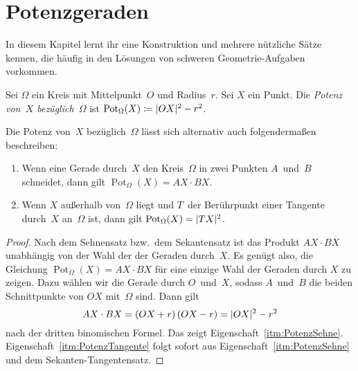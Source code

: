 \section{Potenzgeraden}\label{kapitel:Potenzgeraden}
In diesem Kapitel lernt ihr eine Konstruktion und mehrere nützliche Sätze kennen, die häufig in den Lösungen von schweren Geometrie-Aufgaben vorkommen.
\begin{definition}
	Sei $\Omega$ ein Kreis mit Mittelpunkt~$O$ und Radius~$r$. Sei $X$ ein Punkt. Die \emph{Potenz von~$X$
		bezüglich~$\Omega$} ist $\operatorname{Pot}_\Omega(X)\coloneqq \lvert OX\rvert^2-r^2$.
\end{definition}

\begin{satzmitnamen}
	Die Potenz von~$X$ bezüglich~$\Omega$ lässt sich alternativ auch folgendermaßen beschreiben:
	\begin{enumerate}
		\item \label{itm:PotenzSehne}
		Wenn eine Gerade durch~$X$ den Kreis~$\Omega$ in zwei Punkten $A$~und~$B$ schneidet, dann gilt  $\operatorname{Pot}_\Omega(X)=AX\cdot BX$.
		\item \label{itm:PotenzTangente}
		Wenn $X$ außerhalb von~$\Omega$ liegt und $T$~der Berührpunkt einer Tangente durch~$X$ an~$\Omega$ ist, dann gilt $\operatorname{Pot}_\Omega(X)=\lvert TX\rvert^2$.
	\end{enumerate}
\end{satzmitnamen}

\begin{proof}
	Nach dem Sehnensatz bzw.\ dem Sekantensatz ist das Produkt $AX\cdot BX$ unabhängig von der Wahl der der Geraden durch~$X$.
	Es genügt also, die Gleichung $\operatorname{Pot}_\Omega(X)=AX\cdot BX$ für eine einzige Wahl der Geraden durch $X$ zu zeigen. Dazu wählen wir die Gerade durch $O$~und~$X$, sodass $A$~und~$B$ die beiden Schnittpunkte von $OX$ mit~$\Omega$ sind. Dann gilt
	\begin{equation*}
		AX\cdot BX=(OX+r)\,(OX-r)=\lvert OX\rvert^2-r^2
	\end{equation*}
	nach der dritten binomischen Formel. Das zeigt Eigenschaft~\ref{itm:PotenzSehne}. Eigenschaft~\ref{itm:PotenzTangente} folgt sofort aus Eigenschaft~\ref{itm:PotenzSehne} und dem Sekanten-Tangentensatz.
\end{proof}

